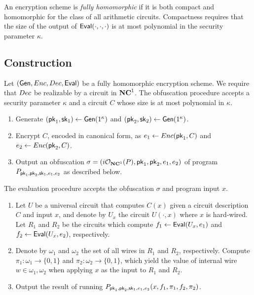 \begin{definition}
An encryption scheme is \emph{fully homomorphic} if it is both compact
and homomorphic for the class of all arithmetic circuits.
Compactness requires that the size of the output of $\mathsf{Eval}(\cdot, \cdot,
\cdot)$ is at most polynomial in the security parameter $\kappa$.
\end{definition}

\subsection{Construction}


\newcommand{\prog}[1]{\ensuremath{P_{\pk_1,\pk_2,\sk_{#1},e_1,e_2}}}

Let $(\mathsf{Gen}, Enc, Dec, \mathsf{Eval})$ be a fully homomorphic encryption
scheme.
We require that $Dec$ be realizable by a circuit in $\mathbf{NC}^{1}$.
The obfuscation procedure accepts a security parameter $\kappa$ and
a circuit $C$ whose size is at most polynomial in $\kappa$.
\begin{enumerate}
\item
	Generate $(\mathsf{pk}_1, \mathsf{sk}_1) \gets \mathsf{Gen}(1^\kappa)$ and
	$(\mathsf{pk}_2, \mathsf{sk}_2) \gets \mathsf{Gen}(1^\kappa)$.
\item
	Encrypt $C$, encoded in canonical form, as
	$e_1 \gets Enc(\mathsf{pk}_1, C)$ and $e_2 \gets Enc(\mathsf{pk}_2, C)$.
\item
	Output an obfuscation
	$\sigma = (i\mathcal{O}_{\mathbf{NC}^{1}}(P), \mathsf{pk}_1, \mathsf{pk}_2, e_1, e_2)$
	of program $\prog{1}$ as described below.
\end{enumerate}

The evaluation procedure accepts the obfuscation $\sigma$ and program
input $x$.
\begin{enumerate}
\item
	Let $U$ be a universal circuit that computes $C(x)$ given a
	circuit description $C$ and input $x$, and denote by $U_x$ the
	circuit $U(\cdot, x)$ where $x$ is hard-wired.
	Let $R_1$ and $R_2$ be the circuits which compute
	$f_1 \gets \mathsf{Eval}(U_x, e_1)$ and $f_2 \gets \mathsf{Eval}(U_x, e_2)$,
	respectively.

\item
	Denote by $\omega_1$ and $\omega_2$ the set of all wires in $R_1$
	and $R_2$, respectively.
	Compute $\pi_1 : \omega_1 \to \{ 0, 1 \}$ and
	$\pi_2 : \omega_2 \to \{ 0, 1 \}$, which yield the value of internal
	wire $w \in \omega_1, \omega_2$ when applying $x$ as the input
	to $R_1$ and $R_2$.

\item
	Output the result of running $\prog{1}(x, f_1, \pi_1, f_2, \pi_2)$.
\end{enumerate}


